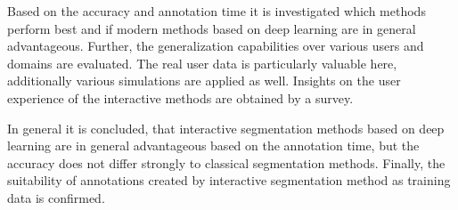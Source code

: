 Based on the accuracy and annotation time it is investigated which methods perform best and if modern methods based on deep learning are in general advantageous.
Further, the generalization capabilities over various users and domains are evaluated.
The real user data is particularly valuable here, additionally various simulations are applied as well.
Insights on the user experience of the interactive methods are obtained by a survey.

In general it is concluded, that interactive segmentation methods based on deep learning are in general advantageous based on the annotation time, but the accuracy does not differ strongly to classical segmentation methods. 
Finally, the suitability of annotations created by interactive segmentation method as training data is confirmed.
